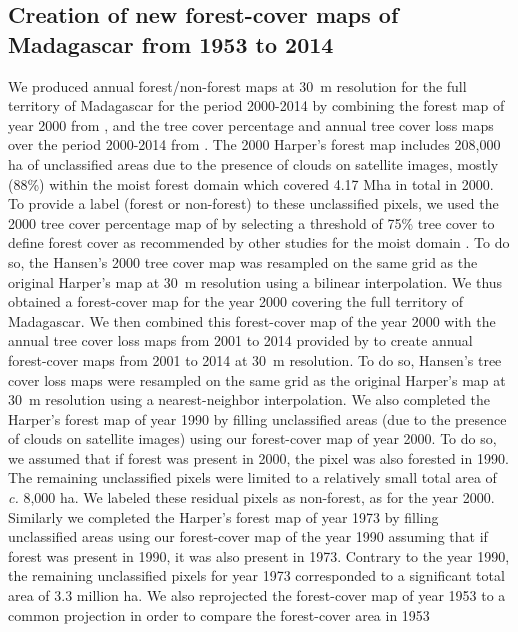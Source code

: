 \documentclass[a4paper, 12pt, leqno]{article} %
\begin{document}
\subsection{Creation of new forest-cover maps of Madagascar from
1953 to 2014}

We produced annual forest/non-forest maps at 30~m resolution for the
full territory of Madagascar for the period 2000-2014 by combining the
forest map of year 2000 from \citet{Harper2007}, and the tree cover
percentage and annual tree cover loss maps over the period 2000-2014
from \citet{Hansen2013}. The 2000 Harper's forest map includes 208,000
ha of unclassified areas due to the presence of clouds on satellite
images, mostly (88\%) within the moist forest domain which covered
4.17 Mha in total in 2000. To provide a label (forest or non-forest)
to these unclassified pixels, we used the 2000 tree cover percentage
map of \citet{Hansen2013} by selecting a threshold of 75\% tree cover
to define forest cover as recommended by other studies for the moist
domain \citep{Achard2014, Aleman2017}. To do so, the Hansen's 2000
tree cover map was resampled on the same grid as the original Harper's
map at 30~m resolution using a bilinear interpolation. We thus
obtained a forest-cover map for the year 2000 covering the full
territory of Madagascar. We then combined this forest-cover map of the
year 2000 with the annual tree cover loss maps from 2001 to 2014
provided by \citet{Hansen2013} to create annual forest-cover maps from
2001 to 2014 at 30~m resolution. To do so, Hansen's tree cover loss
maps were resampled on the same grid as the original Harper's map at
30~m resolution using a nearest-neighbor interpolation. We also
completed the Harper's forest map of year 1990 by filling unclassified
areas (due to the presence of clouds on satellite images) using our
forest-cover map of year 2000. To do so, we assumed that if forest was
present in 2000, the pixel was also forested in 1990. The remaining
unclassified pixels were limited to a relatively small total area of
\emph{c.} 8,000 ha. We labeled these residual pixels as non-forest, as
for the year 2000. Similarly we completed the Harper's forest map of
year 1973 by filling unclassified areas using our forest-cover map of
the year 1990 assuming that if forest was present in 1990, it was also
present in 1973. Contrary to the year 1990, the remaining unclassified
pixels for year 1973 corresponded to a significant total area of 3.3
million ha. We also reprojected the forest-cover map of year 1953 to a
common projection in order to compare the forest-cover area in 1953
\end{document}
